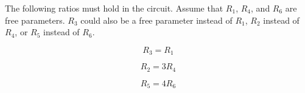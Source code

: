 The following ratios must hold in the circuit.
Assume that $R_1$, $R_4$, and $R_6$ are free parameters.
$R_3$ could also be a free parameter instead of $R_1$, $R_2$ instead of $R_4$, or $R_5$ instead of $R_6$.

\begin{equation}
	\label{eq:final_r3_r1}
	R_3 = R_1
\end{equation}

\begin{equation}
	\label{eq:final_r2_r4}
	R_2 = 3 R_4
\end{equation}

\begin{equation}
	\label{eq:final_r5_r6}
	R_5 = 4 R_6
\end{equation}
